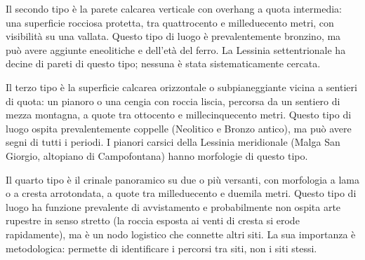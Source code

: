 Il secondo tipo è la parete calcarea verticale con overhang a quota intermedia: una superficie rocciosa protetta, tra quattrocento e milleduecento metri, con visibilità su una vallata. Questo tipo di luogo è prevalentemente bronzino, ma può avere aggiunte eneolitiche e dell'età del ferro. La Lessinia settentrionale ha decine di pareti di questo tipo; nessuna è stata sistematicamente cercata.

Il terzo tipo è la superficie calcarea orizzontale o subpianeggiante vicina a sentieri di quota: un pianoro o una cengia con roccia liscia, percorsa da un sentiero di mezza montagna, a quote tra ottocento e millecinquecento metri. Questo tipo di luogo ospita prevalentemente coppelle (Neolitico e Bronzo antico), ma può avere segni di tutti i periodi. I pianori carsici della Lessinia meridionale (Malga San Giorgio, altopiano di Campofontana) hanno morfologie di questo tipo.

Il quarto tipo è il crinale panoramico su due o più versanti, con morfologia a lama o a cresta arrotondata, a quote tra milleduecento e duemila metri. Questo tipo di luogo ha funzione prevalente di avvistamento e probabilmente non ospita arte rupestre in senso stretto (la roccia esposta ai venti di cresta si erode rapidamente), ma è un nodo logistico che connette altri siti. La sua importanza è metodologica: permette di identificare i percorsi tra siti, non i siti stessi.

